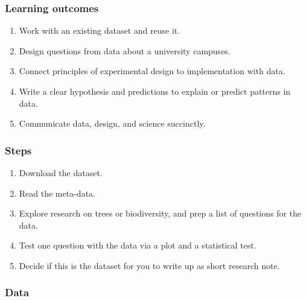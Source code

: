 \documentclass[
]{book}
\providecommand{\tightlist}{%
  \setlength{\itemsep}{0pt}\setlength{\parskip}{0pt}}
\begin{document}
\hypertarget{learning-outcomes-4}{%
\subsubsection*{Learning outcomes}\label{learning-outcomes-4}}

\begin{enumerate}
\def\labelenumi{\arabic{enumi}.}
\tightlist
\item
  Work with an existing dataset and reuse it.\\
\item
  Design questions from data about a university campuses.\\
\item
  Connect principles of experimental design to implementation with data.\\
\item
  Write a clear hypothesis and predictions to explain or predict patterns in data.\\
\item
  Communicate data, design, and science succinctly.
\end{enumerate}

\hypertarget{steps-4}{%
\subsubsection*{Steps}\label{steps-4}}

\begin{enumerate}
\def\labelenumi{\arabic{enumi}.}
\tightlist
\item
  Download the dataset.\\
\item
  Read the meta-data.\\
\item
  Explore research on trees or biodiversity, and prep a list of questions for the data.
\item
  Test one question with the data via a plot and a statistical test.\\
\item
  Decide if this is the dataset for you to write up as short research note.
\end{enumerate}

\hypertarget{data-4}{%
\subsubsection*{Data}\label{data-4}}
\end{document}
